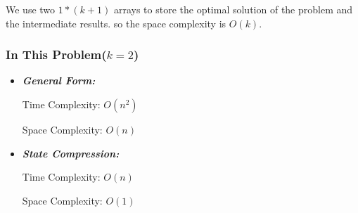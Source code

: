 \documentclass[UTF8,a4paper,12pt]{article}
\begin{document}
\begin{CJK}{UTF8}{gkai}
\begin{itemize}
			\setlength{\parindent}{2em}We use two $ 1*(k+1) $ arrays to store the optimal solution of the problem and the intermediate results. so the space complexity is $ O(k) $. 
		\end{itemize}
		
	\subsubsection{In This Problem($ k=2 $)}
		\begin{itemize}
			\item{\textbf{\textit{General Form:}}}
			
			\setlength{\parindent}{4em}	Time Complexity: $ O(n^{2}) $
			
			\setlength{\parindent}{4em}	Space Complexity: $ O(n) $
			
			
			\item{\textbf{\textit{State Compression:}}}	
			
			\setlength{\parindent}{4em}	Time Complexity: $ O(n) $
			
			\setlength{\parindent}{4em}	Space Complexity: $ O(1) $
		\end{itemize}
		
	\end{CJK}	
\end{document}
